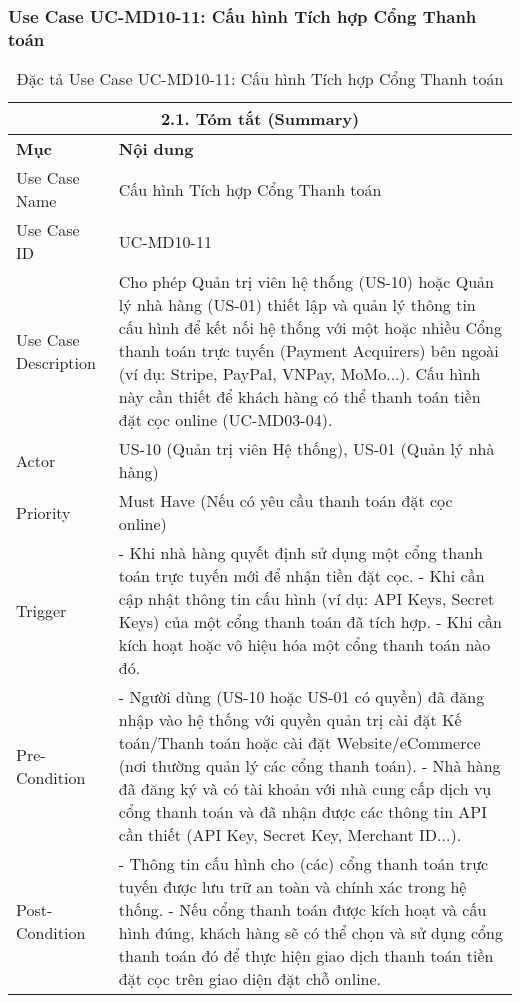 \subsubsection{Use Case UC-MD10-11: Cấu hình Tích hợp Cổng Thanh toán}
\begin{longtable}{|m{4cm}|p{11cm}|}
\caption{Đặc tả Use Case UC-MD10-11: Cấu hình Tích hợp Cổng Thanh toán} \label{tab:uc_md10_11_full_v2_latex_fixed_in_codeblock} \\
\hline
\multicolumn{2}{|c|}{\textbf{2.1. Tóm tắt (Summary)}} \\
\hline
\textbf{Mục} & \textbf{Nội dung} \\
\hline
\endhead %
\midrule
\endfoot %
\bottomrule
\endlastfoot %
Use Case Name & Cấu hình Tích hợp Cổng Thanh toán \\
\hline
Use Case ID & UC-MD10-11 \\
\hline
Use Case Description & Cho phép Quản trị viên hệ thống (US-10) hoặc Quản lý nhà hàng (US-01) thiết lập và quản lý thông tin cấu hình để kết nối hệ thống với một hoặc nhiều Cổng thanh toán trực tuyến (Payment Acquirers) bên ngoài (ví dụ: Stripe, PayPal, VNPay, MoMo...). Cấu hình này cần thiết để khách hàng có thể thanh toán tiền đặt cọc online (UC-MD03-04). \\
\hline
Actor & US-10 (Quản trị viên Hệ thống), US-01 (Quản lý nhà hàng) \\
\hline
Priority & Must Have (Nếu có yêu cầu thanh toán đặt cọc online) \\
\hline
Trigger & - Khi nhà hàng quyết định sử dụng một cổng thanh toán trực tuyến mới để nhận tiền đặt cọc. \newline - Khi cần cập nhật thông tin cấu hình (ví dụ: API Keys, Secret Keys) của một cổng thanh toán đã tích hợp. \newline - Khi cần kích hoạt hoặc vô hiệu hóa một cổng thanh toán nào đó. \\
\hline
Pre-Condition & - Người dùng (US-10 hoặc US-01 có quyền) đã đăng nhập vào hệ thống với quyền quản trị cài đặt Kế toán/Thanh toán hoặc cài đặt Website/eCommerce (nơi thường quản lý các cổng thanh toán). \newline - Nhà hàng đã đăng ký và có tài khoản với nhà cung cấp dịch vụ cổng thanh toán và đã nhận được các thông tin API cần thiết (API Key, Secret Key, Merchant ID...). \\
\hline
Post-Condition & - Thông tin cấu hình cho (các) cổng thanh toán trực tuyến được lưu trữ an toàn và chính xác trong hệ thống. \newline - Nếu cổng thanh toán được kích hoạt và cấu hình đúng, khách hàng sẽ có thể chọn và sử dụng cổng thanh toán đó để thực hiện giao dịch thanh toán tiền đặt cọc trên giao diện đặt chỗ online. \\

\end{longtable}
